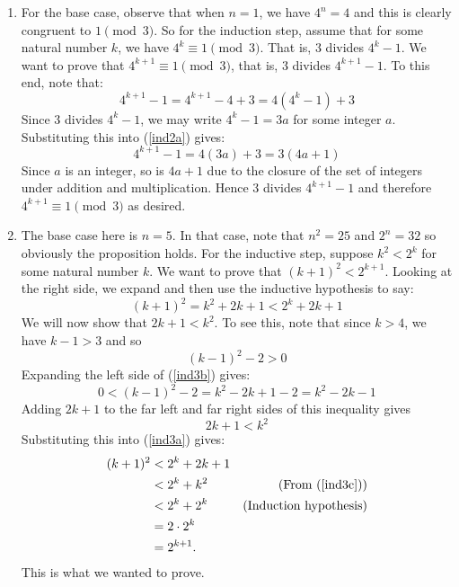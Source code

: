 \documentclass[addpoints]{exam}
\begin{document}
\begin{questions}
\begin{solution}
\begin{enumerate}
	\item For the base case, observe that when $n=1$, we have $4^n = 4$ and this is clearly congruent to $1 \pmod 3$. So for the induction step, assume that for some natural number $k$, we have $4^k \equiv 1 \pmod 3$. That is, $3$ divides $4^k - 1$. We want to prove that $4^{k+1} \equiv 1 \pmod 3$, that is, $3$ divides $4^{k+1} - 1$. To this end, note that: 
	\begin{equation}\label{ind2a}
		4^{k+1} - 1 = 4^{k+1} - 4 + 3 = 4(4^k - 1) + 3
	\end{equation}
	Since $3$ divides $4^k-1$, we may write $4^k - 1 = 3a$ for some integer $a$. Substituting this into (\ref{ind2a}) gives: 
	\begin{equation*}
		4^{k+1} - 1 = 4(3a) + 3 = 3(4a + 1) 
	\end{equation*}
	Since $a$ is an integer, so is $4a + 1$ due to the closure of the set of integers under addition and multiplication. Hence $3$ divides $4^{k+1} - 1$ and therefore $4^{k+1} \equiv 1 \pmod 3$ as desired. 

	\item The base case here is $n=5$. In that case, note that $n^2 = 25$ and $2^n = 32$ so obviously the proposition holds. For the inductive step, suppose $k^2 < 2^k$ for some natural number $k$. We want to prove that $(k+1)^2 < 2^{k+1}$. Looking at the right side, we expand and then use the inductive hypothesis to say: 
	\begin{equation}\label{ind3a}
		(k+1)^2 = k^2 + 2k + 1 < 2^k + 2k + 1 
	\end{equation}
We will now show that $2k + 1 < k^2$. To see this, note that since $k > 4$, we have $k-1 > 3$ and so
	\begin{equation}\label{ind3b}
		(k-1)^2 - 2 > 0
	\end{equation}
	Expanding the left side of (\ref{ind3b}) gives: 
	\begin{equation}
		0 < (k-1)^2 - 2 = k^2 - 2k + 1 - 2 = k^2 - 2k - 1
	\end{equation}
Adding $2k+1$ to the far left and far right sides of this inequality gives 
	\begin{equation}\label{ind3c}
		2k+1 < k^2
	\end{equation}
	Substituting this into (\ref{ind3a}) gives: 
	\begin{align*}
		(k+1)^2 &< 2^k + 2k + 1 & \\
		        &< 2^k + k^2  & \text{(From (\ref{ind3c}))} \\
		        &< 2^k + 2^k & \text{(Induction hypothesis)} \\
		        &= 2 \cdot 2^k & \\
		       &= 2^{k+1}.
	\end{align*}
This is what we wanted to prove. 
	\end{enumerate}
\end{solution}




\end{questions}
\end{document}

